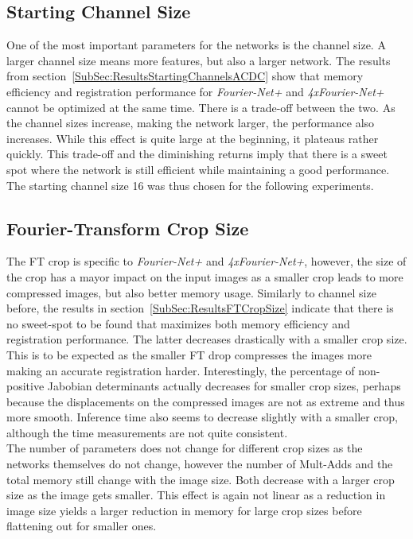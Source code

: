 \subsection{Starting Channel Size} \label{SubSec:DiscussionStartingChannelsACDC}
One of the most important parameters for the networks is the channel size. A larger channel size means more features, but also a larger network. The results from section~\ref{SubSec:ResultsStartingChannelsACDC} show that memory efficiency and registration performance for \emph{Fourier-Net+} and \emph{4xFourier-Net+} cannot be optimized at the same time. There is a trade-off between the two. As the channel sizes increase, making the network larger, the performance also increases. While this effect is quite large at the beginning, it plateaus rather quickly. This trade-off and the diminishing returns imply that there is a sweet spot where the network is still efficient while maintaining a good performance. The starting channel size 16 was thus chosen for the following experiments.

\subsection{Fourier-Transform Crop Size} \label{SubSec:DiscussionFTCropSize}
The FT crop is specific to \emph{Fourier-Net+} and \emph{4xFourier-Net+}, however, the size of the crop has a mayor impact on the input images as a smaller crop leads to more compressed images, but also better memory usage. Similarly to channel size before, the results in section~\ref{SubSec:ResultsFTCropSize} indicate that there is no sweet-spot to be found that maximizes both memory efficiency and registration performance. The latter decreases drastically with a smaller crop size. This is to be expected as the smaller FT drop compresses the images more  making an accurate registration harder. Interestingly, the percentage of non-positive Jabobian determinants actually decreases for smaller crop sizes, perhaps because the displacements on the compressed images are not as extreme and thus more smooth. Inference time also seems to decrease slightly with a smaller crop, although the time measurements are not quite consistent.\\
The number of parameters does not change for different crop sizes as the networks themselves do not change, however the number of Mult-Adds and the total memory still change with the image size. Both decrease with a larger crop size as the image gets smaller. This effect is again not linear as a reduction in image size yields a larger reduction in memory for large crop sizes before flattening out for smaller ones. 

